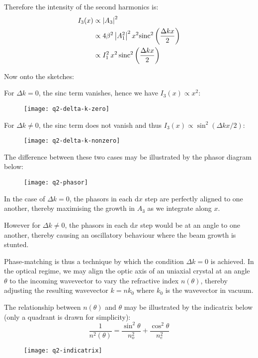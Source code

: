 \begin{parts}
	Therefore the intensity of the second harmonics is:
	\begin{align*}
		I_3 (x) &\propto \left|A_3\right|^2 \\
		&\propto 4\beta^2 \left|A_1^2\right|^2 x^2 \textnormal{sinc}^2\left(\frac{\Delta kx}{2}\right) \\
		&\propto I_1^2 \, x^2 \, \textnormal{sinc}^2\left(\frac{\Delta kx}{2}\right)
	\end{align*}
	
	\newpage
	Now onto the sketches:
	\begin{subparts}
		\subpart For $\Delta k = 0$, the sinc term vanishes, hence we have $I_3 (x) \propto x^2$:
		\begin{figure}[H]
			\centering
			\texttt{[image: q2-delta-k-zero]}
		\end{figure}
		
		\subpart For $\Delta k \neq 0$, the sinc term does not vanish and thus $I_3 (x) \propto \sin^2(\Delta kx/2)$:
		\begin{figure}[H]
			\centering
			\texttt{[image: q2-delta-k-nonzero]}
		\end{figure}
	\end{subparts}
	The difference between these two cases may be illustrated by the phasor diagram below:
	\begin{figure}[H]
		\centering
		\texttt{[image: q2-phasor]}
	\end{figure}
	In the case of $\Delta k = 0$, the phasors in each $\mathrm{d}x$ step are perfectly aligned to one another, thereby maximising the growth in $A_3$ as we integrate along $x$.
	
	However for $\Delta k \neq 0$, the phasors in each $\mathrm{d}x$ step would be at an angle to one another, thereby causing an oscillatory behaviour where the beam growth is stunted.
	
	Phase-matching is thus a technique by which the condition $\Delta k = 0$ is achieved.
	In the optical regime, we may align the optic axis of an uniaxial crystal at an angle $\theta$ to the incoming wavevector to vary the refractive index $n(\theta)$, thereby adjusting the resulting wavevector $k=nk_0$ where $k_0$ is the wavevector in vacuum.
	
	The relationship between $n(\theta)$ and $\theta$ may be illustrated by the indicatrix below (only a quadrant is drawn for simplicity):
	\begin{equation*}
		\frac{1}{n^2(\theta)} = \frac{\sin^2 \theta}{n_o^2} + \frac{\cos^2 \theta}{n_e^2}
	\end{equation*}
	\begin{figure}[H]
		\centering
		\texttt{[image: q2-indicatrix]}
	\end{figure}
	

\end{parts}
